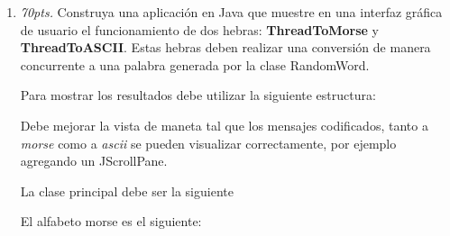 \documentclass[10pt]{article}
\begin{document}
{\begin{enumerate}
\begin{multicols}{2}
\end{multicols}

\newpage

\item \emph{70pts.} Construya una aplicaci\'on en Java que muestre en una interfaz gr\'afica de usuario el funcionamiento de dos hebras: \textbf{ThreadToMorse} y \textbf{ThreadToASCII}. Estas hebras deben realizar una conversi\'on de manera concurrente a una palabra generada por la clase RandomWord. 

 

Para mostrar los resultados debe utilizar la siguiente estructura:

 

Debe mejorar la vista de maneta tal que los mensajes codificados, tanto a \emph{morse} como a \emph{ascii} se pueden visualizar correctamente, por ejemplo agregando un JScrollPane.

La clase principal debe ser la siguiente

 

El alfabeto morse es el siguiente:


\end{enumerate}}
\end{document}
